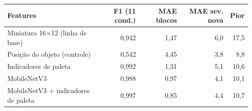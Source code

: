 \begin{tabular}{lrrrr}
\toprule
Features & F1 (11 cond.) & MAE blocos & MAE sev. nova & Pior \\
\midrule
Miniatura 16$\times$12 (linha de base) & 0,942 & 1,47 & 6,0 & 17,5 \\
Posição do objeto (controle) & 0,542 & 4,45 & 3,8 & 8,8 \\
Indicadores de paleta & 0,992 & 1,31 & 5,1 & 10,6 \\
MobileNetV3 & 0,988 & 0,97 & 4,1 & 10,1 \\
MobileNetV3 + indicadores de paleta & 0,997 & 0,85 & 4,4 & 10,7 \\
\bottomrule
\end{tabular}
